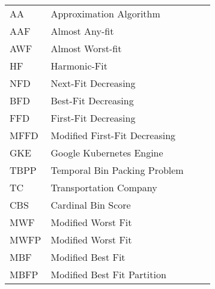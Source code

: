 \begin{flushleft}
\begin{tabular}{l p{0.8\linewidth}}
AA       & Approximation Algorithm \\
AAF      & Almost Any-fit \\
AWF      & Almost Worst-fit \\
HF       & Harmonic-Fit \\ 
NFD      & Next-Fit Decreasing \\
BFD      & Best-Fit Decreasing \\
FFD      & First-Fit Decreasing \\
MFFD     & Modified First-Fit Decreasing \\
GKE      & Google Kubernetes Engine \\
TBPP     & Temporal Bin Packing Problem \\
TC       & Transportation Company \\
CBS      & Cardinal Bin Score \\
MWF      & Modified Worst Fit \\
MWFP     & Modified Worst Fit \\
MBF      & Modified Best Fit \\
MBFP     & Modified Best Fit Partition \\
\end{tabular}
\end{flushleft}


